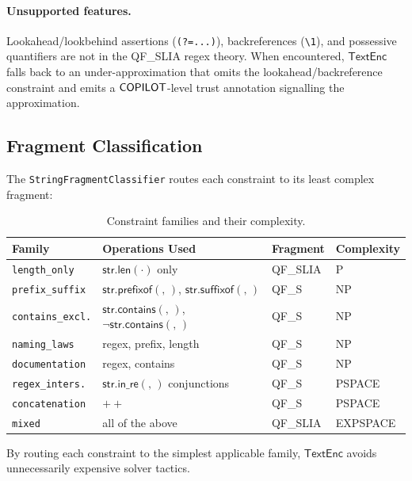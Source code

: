 \documentclass[11pt]{article}
\newcommand{\TextEnc}{\ensuremath{\mathsf{TextEnc}}}
\newcommand{\QFSLIA}{\textsf{QF\_SLIA}}
\newcommand{\QFS}{\textsf{QF\_S}}
\newcommand{\strlen}[1]{\ensuremath{\mathsf{str.len}(#1)}}
\newcommand{\strpre}[2]{\ensuremath{\mathsf{str.prefixof}(#1,\,#2)}}
\newcommand{\strsuf}[2]{\ensuremath{\mathsf{str.suffixof}(#1,\,#2)}}
\newcommand{\strinre}[2]{\ensuremath{\mathsf{str.in\_re}(#1,\,#2)}}
\newcommand{\strconcat}[2]{\ensuremath{#1 \mathbin{+\!\!+} #2}}
\newcommand{\strcont}[2]{\ensuremath{\mathsf{str.contains}(#1,\,#2)}}
\begin{document}
\paragraph{Unsupported features.}
Lookahead/lookbehind assertions (\texttt{(?=...)}), backreferences
(\texttt{\textbackslash 1}), and possessive quantifiers are not in the \QFSLIA{} regex
theory.  When encountered, \TextEnc{} falls back to an under-approximation
that omits the lookahead/backreference constraint and emits a
$\mathsf{COPILOT}$-level trust annotation signalling the approximation.

\subsection{Fragment Classification}
\label{sec:fragment}

The \texttt{StringFragmentClassifier} routes each constraint to its least
complex fragment:

\begin{table}[h]
\centering
\caption{Constraint families and their complexity.}
\label{tab:families}
\begin{tabular}{llll}
\hline
\textbf{Family} & \textbf{Operations Used} & \textbf{Fragment} & \textbf{Complexity} \\
\hline
\texttt{length\_only}      & $\strlen{\cdot}$ only             & \QFSLIA  & P \\
\texttt{prefix\_suffix}    & \strpre{}{}, \strsuf{}{}          & \QFS     & NP \\
\texttt{contains\_excl.}   & \strcont{}{}, $\neg\strcont{}{}$  & \QFS     & NP \\
\texttt{naming\_laws}      & regex, prefix, length              & \QFS     & NP \\
\texttt{documentation}     & regex, contains                    & \QFS     & NP \\
\texttt{regex\_inters.}    & $\strinre{}{}$ conjunctions       & \QFS     & PSPACE \\
\texttt{concatenation}     & $\strconcat{}{}$                  & \QFS     & PSPACE \\
\texttt{mixed}             & all of the above                  & \QFSLIA  & EXPSPACE \\
\hline
\end{tabular}
\end{table}

By routing each constraint to the simplest applicable family, \TextEnc{}
avoids unnecessarily expensive solver tactics.
\end{document}
